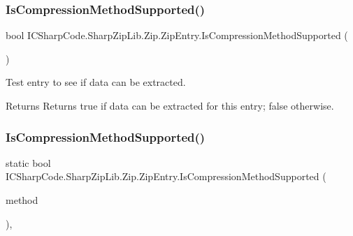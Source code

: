 \subsubsection{\texorpdfstring{Is\+Compression\+Method\+Supported()}{IsCompressionMethodSupported()}\hspace{0.1cm}{\footnotesize\ttfamily [3/4]}}
{\footnotesize\ttfamily bool I\+C\+Sharp\+Code.\+Sharp\+Zip\+Lib.\+Zip.\+Zip\+Entry.\+Is\+Compression\+Method\+Supported (\begin{DoxyParamCaption}{ }\end{DoxyParamCaption})\hspace{0.3cm}{\ttfamily [inline]}}



Test entry to see if data can be extracted. 

\begin{DoxyReturn}{Returns}
Returns true if data can be extracted for this entry; false otherwise.
\end{DoxyReturn}
\mbox{\label{class_i_c_sharp_code_1_1_sharp_zip_lib_1_1_zip_1_1_zip_entry_ad464679f6e18df0d48a71dbc47fa1ac5}} 
\subsubsection{\texorpdfstring{Is\+Compression\+Method\+Supported()}{IsCompressionMethodSupported()}\hspace{0.1cm}{\footnotesize\ttfamily [4/4]}}
{\footnotesize\ttfamily static bool I\+C\+Sharp\+Code.\+Sharp\+Zip\+Lib.\+Zip.\+Zip\+Entry.\+Is\+Compression\+Method\+Supported (\begin{DoxyParamCaption}\item[{\hyperlink{namespace_i_c_sharp_code_1_1_sharp_zip_lib_1_1_zip_a90a0e174eca72bf6b490bae40d83a09e}{Compression\+Method}}]{method }\end{DoxyParamCaption})\hspace{0.3cm}{\ttfamily [inline]}, {\ttfamily [static]}}



